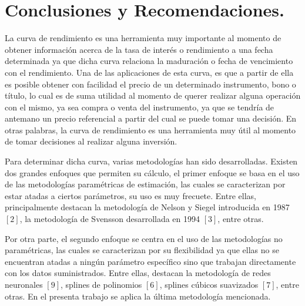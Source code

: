 \section{Conclusiones y Recomendaciones.}

\hspace{0.4cm}La curva de rendimiento es una herramienta muy importante al momento de obtener informaci\'on acerca de la tasa de inter\'es o rendimiento a una fecha determinada ya que dicha curva relaciona la maduraci\'on o fecha de vencimiento con el rendimiento. Una de las aplicaciones de esta curva, es que a partir de ella es posible obtener con facilidad el precio de un determinado instrumento, bono o t\'itulo, lo cual es de suma utilidad al momento de querer realizar alguna operaci\'on con el mismo, ya sea compra o venta del instrumento, ya que se tendr\'ia de antemano un precio referencial a partir del cual se puede tomar una decisi\'on. En otras palabras, la curva de rendimiento es una herramienta muy \'util al momento de tomar decisiones al realizar alguna inversi\'on.

\vspace{0.5cm}

\hspace{0.4cm} Para determinar dicha curva, varias metodolog\'ias han sido desarrolladas. Existen dos grandes enfoques que permiten su c\'alculo, el primer enfoque se basa en el uso de las metodolog\'ias param\'etricas de estimaci\'on, las cuales se caracterizan por estar atadas a ciertos par\'ametros, su uso es muy frecuete. Entre ellas, principalmente destacan la metodolog\'ia de Nelson y Siegel introducida en 1987 $[2]$, la metodolog\'ia de Svensson desarrollada en 1994 $[3]$, entre otras.

\vspace{0.5cm}

\hspace{0.4cm}Por otra parte, el segundo enfoque se centra en el uso de las metodolog\'ias no param\'etricas, las cuales se caracterizan por su flexibilidad ya que ellas no se encuentran atadas a ning\'un par\'ametro espec\'ifico sino que trabajan directamente con los datos suministrados. Entre ellas, destacan la metodolog\'ia de redes neuronales $[9]$, splines de polinomios $[6]$, splines c\'ubicos suavizados $[7]$, entre otras. En el presenta trabajo se aplica la \'ultima metodolog\'ia mencionada.

\vspace{0.5cm}

